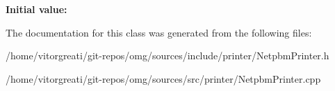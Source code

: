 {\bfseries Initial value\+:}
\begin{DoxyCode}{0}
\DoxyCodeLine{= \{}
\DoxyCodeLine{        \}}

\end{DoxyCode}


The documentation for this class was generated from the following files\+:\begin{DoxyCompactItemize}
\item 
/home/vitorgreati/git-\/repos/omg/sources/include/printer/Netpbm\+Printer.\+h\item 
/home/vitorgreati/git-\/repos/omg/sources/src/printer/Netpbm\+Printer.\+cpp\end{DoxyCompactItemize}
